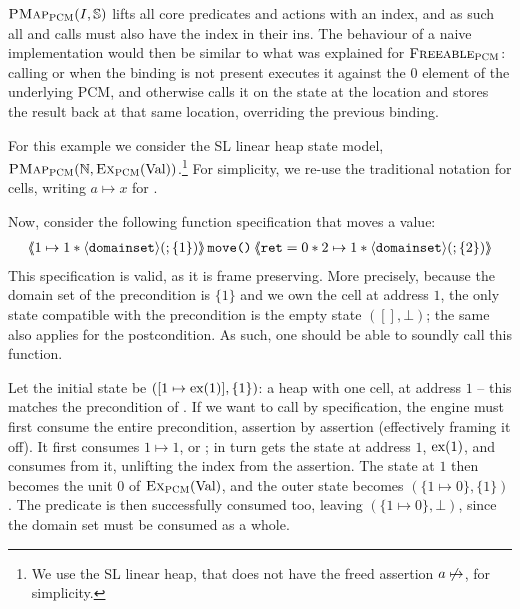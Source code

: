 $\textsc{PMap}_{\textsc{PCM}}(I,\mathbb S)$ lifts all core predicates and actions with an index, and as such all \consume{} and \produce{} calls must also have the index in their ins. The behaviour of a naive implementation would then be similar to what was explained for $\textsc{Freeable}_{\textsc{PCM}}$: calling \consume{} or \produce{} when the binding is not present executes it against the $0$ element of the underlying PCM, and otherwise calls it on the state at the location and stores the result back at that same location, overriding the previous binding.

For this example we consider the SL linear heap state model, $\textsc{PMap}_{\textsc{PCM}}(\mathbb N, \textsc{Ex}_{\textsc{PCM}}(\text{Val}))$.\footnote{We use the SL linear heap, that does not have the freed assertion $a\not\mapsto$, for simplicity.} For simplicity, we re-use the traditional notation for cells, writing $a \mapsto x$ for .

Now, consider the following function specification that moves a value:
\begin{align*}
\left<\mkern-5mu\left<1\mapsto 1 * \left<\texttt{domainset}\right>\!(;\{1\})\right>\mkern-5mu\right>\texttt{move()}\left<\mkern-5mu\left<\texttt{ret}=0 * 2\mapsto 1 * \left<\texttt{domainset}\right>\!(;\{2\})\right>\mkern-5mu\right>
\end{align*}
This specification is valid, as it is frame preserving. More precisely, because the domain set of the precondition is $\{1\}$ and we own the cell at address $1$, the only state compatible with the precondition is the empty state $([], \bot)$; the same also applies for the postcondition. As such, one should be able to soundly call this function.

Let the initial state be $([1\mapsto \text{ex}(1)], \{ 1\} )$: a heap with one cell, at address $1$ -- this matches the precondition of . If we want to call  by specification, the engine must first consume the entire precondition, assertion by assertion (effectively framing it off). It first consumes $1\mapsto 1$, or ; \PMap{} in turn gets the state at address $1$, $\text{ex}(1)$, and consumes  from it, unlifting the index from the assertion. The state at $1$ then becomes the unit $0$ of $\textsc{Ex}_{\textsc{PCM}}(\text{Val})$, and the outer state becomes ${(\{ 1\mapsto 0\}, \{ 1\})}$. The \domainset{} predicate is then successfully consumed too, leaving ${(\{ 1\mapsto 0\},\bot)}$, since the domain set must be consumed as a whole. 

